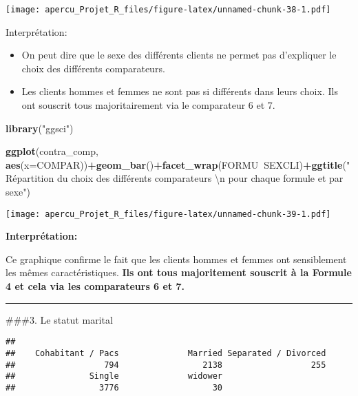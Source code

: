 \documentclass[
]{article}
\newenvironment{Shaded}{\begin{snugshade}}{\end{snugshade}}
\newcommand{\CharTok}[1]{\textcolor[rgb]{0.31,0.60,0.02}{#1}}
\newcommand{\DataTypeTok}[1]{\textcolor[rgb]{0.13,0.29,0.53}{#1}}
\newcommand{\KeywordTok}[1]{\textcolor[rgb]{0.13,0.29,0.53}{\textbf{#1}}}
\newcommand{\NormalTok}[1]{#1}
\newcommand{\OperatorTok}[1]{\textcolor[rgb]{0.81,0.36,0.00}{\textbf{#1}}}
\newcommand{\StringTok}[1]{\textcolor[rgb]{0.31,0.60,0.02}{#1}}
\begin{document}
\texttt{[image: apercu\_Projet\_R\_files/figure-latex/unnamed-chunk-38-1.pdf]}

Interprétation:

\begin{itemize}
\item
  On peut dire que le sexe des différents clients ne permet pas
  d'expliquer le choix des différents comparateurs.
\item
  Les clients hommes et femmes ne sont pas si différents dans leurs
  choix. Ils ont souscrit tous majoritairement via le comparateur 6 et
  7.
\end{itemize}

\begin{Shaded}
\begin{Highlighting}[]
\KeywordTok{library}\NormalTok{(}\StringTok{"ggsci"}\NormalTok{)}

\KeywordTok{ggplot}\NormalTok{(contra_comp, }\KeywordTok{aes}\NormalTok{(}\DataTypeTok{x=}\NormalTok{COMPAR))}\OperatorTok{+}\KeywordTok{geom_bar}\NormalTok{()}\OperatorTok{+}\KeywordTok{facet_wrap}\NormalTok{(FORMU}\OperatorTok{~}\NormalTok{SEXCLI)}\OperatorTok{+}\KeywordTok{ggtitle}\NormalTok{(}\StringTok{"Répartition du choix des différents comparateurs }\CharTok{\textbackslash{}n}\StringTok{ pour chaque formule et par sexe"}\NormalTok{)}
\end{Highlighting}
\end{Shaded}

\texttt{[image: apercu\_Projet\_R\_files/figure-latex/unnamed-chunk-39-1.pdf]}

\textbf{Interprétation:}

Ce graphique confirme le fait que les clients hommes et femmes ont
sensiblement les mêmes caractéristiques. \textbf{Ils ont tous
majoritement souscrit à la Formule 4 et cela via les comparateurs 6 et
7.}

\begin{center}\rule{0.5\linewidth}{0.5pt}\end{center}

\#\#\#3. Le statut marital

\begin{Shaded}
\end{Shaded}

\begin{verbatim}
## 
##    Cohabitant / Pacs              Married Separated / Divorced 
##                  794                 2138                  255 
##               Single              widower 
##                 3776                   30
\end{verbatim}
\end{document}
